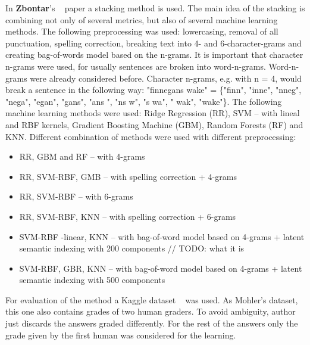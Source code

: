 \documentclass[11pt]{report}
\numberwithin{equation}{section} %
\begin{document}
In \textbf{Zbontar}'s ~\cite{Zbontar} paper a stacking method is used. The main idea of the stacking is combining not only of several metrics, but also of several machine learning methods. The following preprocessing was used: lowercasing, removal of all punctuation, spelling correction, breaking text into 4- and 6-character-grams and creating bag-of-words model based on the n-grams. It is important that character n-grams were used, for usually sentences are broken into word-n-grams. Word-n-grams were already considered before. Character n-grams, e.g. with n = 4, would break a sentence in the following way: "finnegans wake" = \{"finn", "inne", "nneg", "nega", "egan", "gans", "ans ", "ns w", "s wa", " wak", "wake"\}. The following machine learning methods were used: Ridge Regression (RR), SVM -- with lineal and RBF kernels, Gradient Boosting Machine (GBM), Random Forests (RF) and KNN. Different combination of methods were used with different preprocessing:
\begin{itemize}
\item RR, GBM and RF -- with 4-grams
\item RR, SVM-RBF, GMB -- with spelling correction + 4-grams
\item RR, SVM-RBF -- with 6-grams
\item RR, SVM-RBF, KNN -- with spelling correction + 6-grams
\item SVM-RBF -linear, KNN -- with bag-of-word model based on 4-grams + latent semantic indexing with 200 components // TODO: what it is
\item SVM-RBF, GBR, KNN -- with bag-of-word model based on 4-grams + latent semantic indexing with 500 components
\end{itemize}

For evaluation of the method a Kaggle dataset ~\cite{kaggleSas} was used. As Mohler's dataset, this one also contains grades of two human graders. To avoid ambiguity, author just discards the answers graded differently. For the rest of the answers only the grade given by the first human was considered for the learning.
\end{document}
